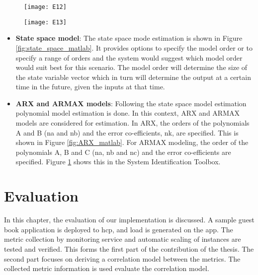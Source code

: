 \documentclass[article,type=msc,colorback,12pt,accentcolor=tud8b,table]{tudthesis}
\begin{document}
	\begin{figure}[H]
		\centering
		\begin{minipage}{.4\textwidth}
			\centering
			\texttt{[image: E12]}
			\label{fig:ARX_matlab}
			
		\end{minipage}%
		\begin{minipage}{.4\textwidth}
			\centering
			\texttt{[image: E13]}
			\label{fig:ARMAX_matlab}
		\end{minipage}
	\end{figure}

	\begin{itemize}
		\item{\textbf{State space model}:} The state space mode estimation is shown in Figure \ref{fig:state_space_matlab}. It provides options to specify the model order or to specify a range of orders and the system would suggest which model order would suit best for this scenario. The model order will determine the size of the state variable vector which in turn will determine the output at a certain time in the future, given the inputs at that time.
		
		\item{\textbf{ARX and ARMAX models}:} 	Following the state space model estimation polynomial model estimation is done. In this context, ARX and ARMAX models are considered for estimation. In ARX, the orders of the polynomials A and B (na and nb) and the error co-efficients, nk, are specified. This is shown in Figure \ref{fig:ARX_matlab}. For ARMAX modeling, the order of the polynomials A, B and C (na, nb and nc) and the error co-efficients are specified. Figure \ref{fig:ARMAX_matlab} shows this in the System Identification Toolbox.
		
	\end{itemize}
 
 \cleardoublepage
 
  \hfill 
 \section{Evaluation}
 \hfill \break
 
 In this chapter, the evaluation of our implementation is discussed. A sample guest book application is deployed to \gls{hcp}, and load is generated on the app. The metric collection by monitoring service and automatic scaling of instances are tested and verified. This forms the first part of the contribution of the thesis. The second part focuses on deriving a correlation model between the metrics. The collected metric information is used evaluate the correlation model. 
\end{document}
